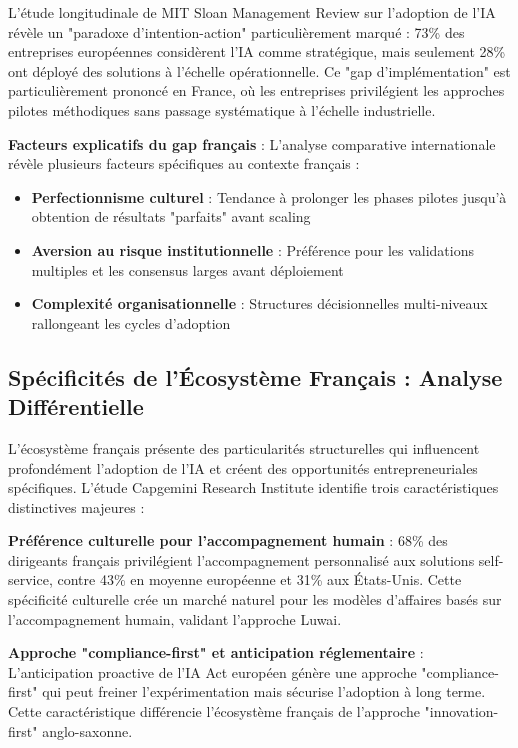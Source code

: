 L'étude longitudinale de MIT Sloan Management Review \cite{ransbotham2023expanding} sur l'adoption de l'IA révèle un "paradoxe d'intention-action" particulièrement marqué : 73\% des entreprises européennes considèrent l'IA comme stratégique, mais seulement 28\% ont déployé des solutions à l'échelle opérationnelle. Ce "gap d'implémentation" est particulièrement prononcé en France, où les entreprises privilégient les approches pilotes méthodiques sans passage systématique à l'échelle industrielle.

\textbf{Facteurs explicatifs du gap français} : L'analyse comparative internationale révèle plusieurs facteurs spécifiques au contexte français :
\begin{itemize}
    \item \textbf{Perfectionnisme culturel} : Tendance à prolonger les phases pilotes jusqu'à obtention de résultats "parfaits" avant scaling
    \item \textbf{Aversion au risque institutionnelle} : Préférence pour les validations multiples et les consensus larges avant déploiement
    \item \textbf{Complexité organisationnelle} : Structures décisionnelles multi-niveaux rallongeant les cycles d'adoption
\end{itemize}

\subsection{Spécificités de l'Écosystème Français : Analyse Différentielle}

L'écosystème français présente des particularités structurelles qui influencent profondément l'adoption de l'IA et créent des opportunités entrepreneuriales spécifiques. L'étude Capgemini Research Institute \cite{capgemini2024ai_france} identifie trois caractéristiques distinctives majeures :

\textbf{Préférence culturelle pour l'accompagnement humain} : 68\% des dirigeants français privilégient l'accompagnement personnalisé aux solutions self-service, contre 43\% en moyenne européenne et 31\% aux États-Unis. Cette spécificité culturelle crée un marché naturel pour les modèles d'affaires basés sur l'accompagnement humain, validant l'approche Luwai.

\textbf{Approche "compliance-first" et anticipation réglementaire} : L'anticipation proactive de l'IA Act européen génère une approche "compliance-first" qui peut freiner l'expérimentation mais sécurise l'adoption à long terme. Cette caractéristique différencie l'écosystème français de l'approche "innovation-first" anglo-saxonne.

